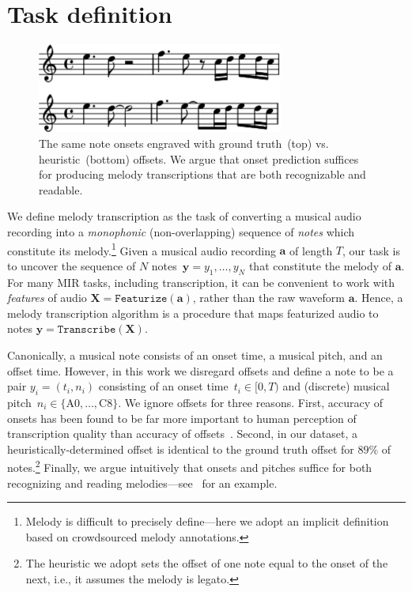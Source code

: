 \section{Task definition}
\label{sec:task}

\begin{figure}
    \centering
    \includegraphics[width=8.1cm]{figs/heuristic_offsets.pdf}
    \caption{
The same note onsets engraved with ground truth~(top) vs. heuristic~(bottom) offsets. 
We argue that onset prediction suffices for producing melody transcriptions that are both recognizable and readable. 
}
 \label{fig:heuristic_offsets}
\end{figure}


We define melody transcription as the task of converting a musical audio recording into a \emph{monophonic} (non-overlapping) sequence of \emph{notes} which constitute its melody.\footnote{Melody is difficult to precisely define---here we adopt an implicit definition based on crowdsourced melody annotations.} Given a musical audio recording $\bm{a}$ of length $T$, our task is to 
uncover 
the sequence of $N$ notes~${\bm{y} = y_1,\dots,y_N}$ that constitute the melody of $\bm{a}$.  For many MIR tasks, including transcription, it can be convenient to work with \emph{features} of audio ${\bm{X} = \texttt{Featurize}(\bm{a})}$, rather than the raw waveform $\bm{a}$. 
Hence, a melody transcription algorithm is a procedure that maps featurized audio to notes ${\bm{y} = \texttt{Transcribe}(\bm{X})}$. 

Canonically, a musical note consists of an onset time, a musical pitch, and an offset time. 
However, in this work  
we disregard offsets and define a note to be a pair ${y_i = (t_i,n_i)}$ consisting of an onset time~${t_i \in [0,T)}$ and (discrete) musical pitch~${n_i \in \{\text{A0},\dots,\text{C8}\}}$.
We ignore offsets for three reasons. 
First, accuracy of onsets has been found to be far more important to human perception of transcription quality than accuracy of offsets~\cite{ycart2020investigating}. 
Second, in our dataset,
a heuristically-determined offset is identical to the ground truth offset for $89\%$ of notes.\footnote{The heuristic we adopt sets the offset of one note equal to the onset of the next, i.e., it assumes the melody is legato.}
Finally, we argue intuitively that onsets and pitches suffice for both recognizing and reading melodies---see~ for an example.


